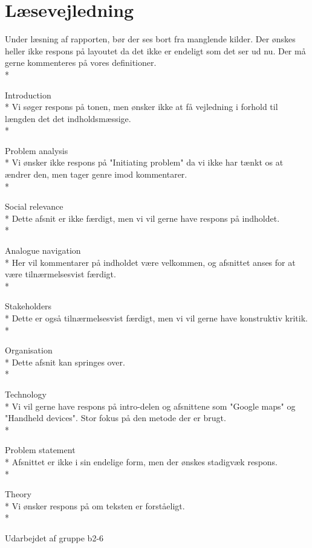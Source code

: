\documentclass[article,11pt]{memoir}
\begin{document}
\section*{Læsevejledning}


Under læsning af rapporten, bør der ses bort fra manglende kilder.
Der ønskes heller ikke respons på layoutet da det ikke er endeligt som det ser ud nu. 
Der må gerne kommenteres på vores definitioner. 
\\*

Introduction \\*
Vi søger respons på tonen, men ønsker ikke at få vejledning i forhold til længden det det indholdsmæssige.
\\*

Problem analysis\\*
Vi ønsker ikke respons på "Initiating problem" da vi ikke har tænkt os at ændrer den, men tager genre imod kommentarer. 
\\*

Social relevance \\*
Dette afsnit er ikke færdigt, men vi vil gerne have respons på indholdet. 
\\*

Analogue navigation \\*
Her vil kommentarer på indholdet være velkommen, og afsnittet anses for at være tilnærmelsesvist færdigt.
\\*

Stakeholders \\*
Dette er også tilnærmelsesvist færdigt, men vi vil gerne have konstruktiv kritik.
\\*

Organisation \\*
Dette afsnit kan springes over.
\\*

Technology \\*
Vi vil gerne have respons på intro-delen og afsnittene som "Google maps" og "Handheld devices". Stor fokus på den metode der er brugt.
\\*

Problem statement\\*
Afsnittet er ikke i sin endelige form, men der ønskes stadigvæk respons.
\\*

Theory \\*
Vi ønsker respons på om teksten er forståeligt.
\\*


Udarbejdet af gruppe b2-6 
\end{document}
